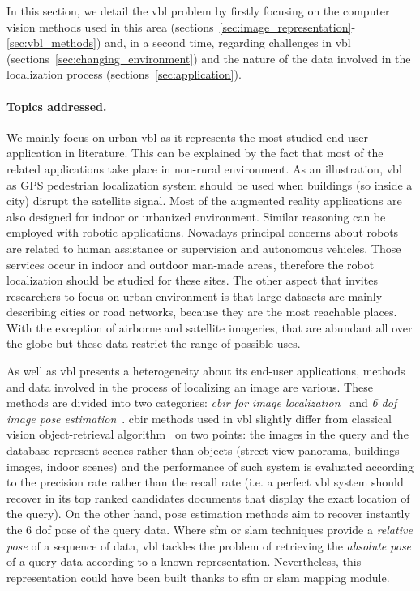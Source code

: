 \label{sec:introduction}
	
	In this section, we detail the \ac{vbl} problem by firstly focusing on the computer vision methods used in this area (sections~\ref{sec:image_representation}-\ref{sec:vbl_methods}) and, in a second time, regarding challenges in \ac{vbl} (sections~\ref{sec:changing_environment}) and the nature of the data involved in the localization process (sections~\ref{sec:application}).
	
	\paragraph{Topics addressed.}
		We mainly focus on urban \ac{vbl} as it represents the most studied end-user application in literature. This can be explained by the fact that most of the related applications take place in non-rural environment. As an illustration, \ac{vbl} as GPS pedestrian localization system should be used when buildings (so inside a city) disrupt the satellite signal. Most of the augmented reality applications are also designed for indoor or urbanized environment. Similar reasoning can be employed with robotic applications. Nowadays principal concerns about robots are related to human assistance or supervision and autonomous vehicles. Those services occur in indoor and outdoor man-made areas, therefore the robot localization should be studied for these sites. The other aspect that invites researchers to focus on urban environment is that large datasets are mainly describing cities or road networks, because they are the most reachable places. With the exception of airborne and satellite imageries, that are abundant all over the globe but these data restrict the range of possible uses.
				
		As well as \ac{vbl} presents a heterogeneity about its end-user applications, methods and data involved in the process of localizing an image are various. These methods are divided into two categories: \textit{\ac{cbir} for image localization}~\citep{Arandjelovic2012,Radenovic2016,Liu2018} and \textit{6 \ac{dof} image pose estimation}~\citep{Sattler2016a, Brachmann2017b,Sarlin2018a}. \ac{cbir} methods used in \ac{vbl} slightly differ from classical vision object-retrieval algorithm~\citep{Sivic2003} on two points: the images in the query and the database represent scenes rather than objects (\eg street view panorama, buildings images, indoor scenes) and the performance of such system is evaluated according to the precision rate rather than the recall rate (i.e. a perfect \ac{vbl} system should recover in its top ranked candidates documents that display the exact location of the query). On the other hand, pose estimation methods aim to recover instantly the 6 \ac{dof} pose of the query data. Where \ac{sfm} or \ac{slam} techniques provide a \textit{relative pose} of a sequence of data, \ac{vbl} tackles the problem of retrieving the \textit{absolute pose} of a query data according to a known representation. Nevertheless, this representation could have been built thanks to \ac{sfm} or \ac{slam} mapping module.
			
